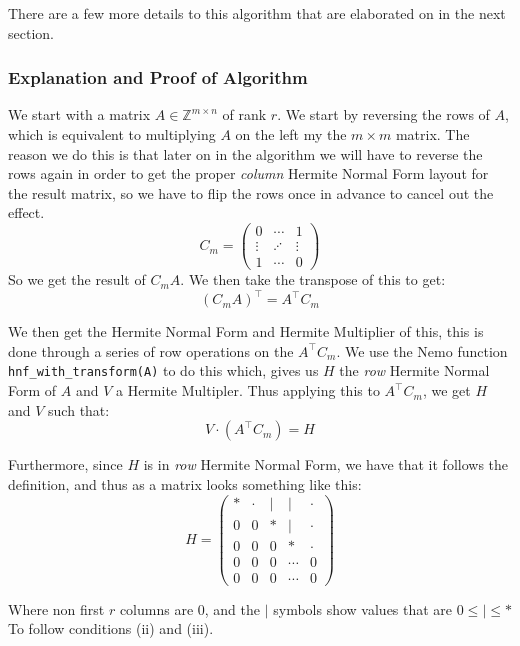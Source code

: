 \documentclass[oneside, a4paper, onecolumn, 11pt]{article}
\newcommand{\Zmn}[2]{\mathbb{Z}^{#1 \times #2}}
\begin{document}
There are a few more details to this algorithm that are elaborated on in the next section.

\subsubsection{Explanation and Proof of Algorithm}

We start with a matrix \(A \in \Zmn{m}{n}\) of rank \(r\). We start by reversing the rows of \(A\), which is equivalent to multiplying \(A\) on the left my the \(m \times m\) matrix. The reason we do this is that later on in the algorithm we will have to reverse the rows again in order to get the proper \textit{column} Hermite Normal Form layout for the result matrix, so we have to flip the rows once in advance to cancel out the effect.
\[
    C_m = \begin{pmatrix}
        0      & \cdots  & 1      \\
        \vdots & \iddots & \vdots \\
        1      & \cdots  & 0
    \end{pmatrix}
\]
So we get the result of \(C_m A\). We then take the transpose of this to get:
\[
    (C_m A)^\intercal = A^\intercal C_m
\]

We then get the Hermite Normal Form and Hermite Multiplier of this, this is done through a series of row operations on the \(A^\intercal C_m\). We use the Nemo function \texttt{hnf\_with\_transform(A)} to do this which, gives us \(H\) the \textit{row} Hermite Normal Form of \(A\) and \(V\) a Hermite Multipler. Thus applying this to \(A^\intercal C_m\), we get \(H\) and \(V\) such that:
\[
    V \cdot (A^\intercal C_m) = H
\]

Furthermore, since \(H\) is in \textit{row} Hermite Normal Form, we have that it follows the definition, and thus as a matrix looks something like this:
\[
    H = \left(
    \begin{array}{ccccc}
            * & \cdot & | & |      & \cdot \\
            0 & 0     & * & |      & \cdot \\
            0 & 0     & 0 & *      & \cdot \\
            0 & 0     & 0 & \cdots & 0     \\
            0 & 0     & 0 & \cdots & 0
        \end{array}
    \right)
\]

Where non first \(r\) columns are \(0\), and the \(|\) symbols show values that are \(0 \le | \le *\) To follow conditions (ii) and (iii).
\end{document}
